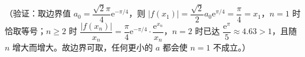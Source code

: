 \begin{answer}
（验证：取边界值 \(a_0=\dfrac{\sqrt2\pi}{4}\mathrm{e}^{-\pi/4}\)，则 \(|f(x_1)|=\dfrac{\sqrt2}{2}a_0\mathrm{e}^{\pi/4}=\dfrac{\pi}{4}=x_1\)，\(n=1\) 时恰取等号；\(n\geqslant2\) 时 \(\dfrac{|f(x_n)|}{x_n}=\dfrac{\pi}{4}\mathrm{e}^{-\pi/4}\cdot\dfrac{\mathrm{e}^{x_n}}{x_n}\)，\(n=2\) 时已达 \(\dfrac{\mathrm{e}^{\pi}}{5}\approx4.63>1\)，且随 \(n\) 增大而增大。故边界可取，任何更小的 \(a\) 都会使 \(n=1\) 不成立。）



\end{answer}